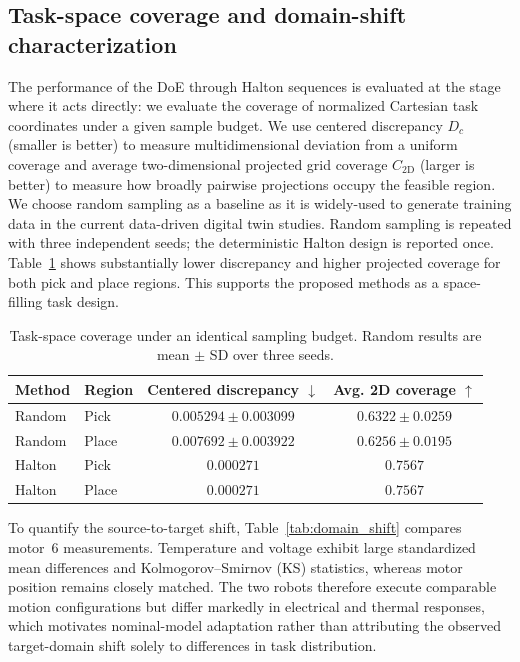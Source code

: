 \documentclass[a4paper,10pt]{cas-sc}%
\newcommand{\roundtworev}[1]{\textcolor{roundtwored}{#1}}
\newenvironment{revision}{}{}
\begin{document}
\subsection{Task-space coverage and domain-shift characterization}\label{sec:5-sensitivity}

\begin{revision}
	The performance of the DoE through Halton sequences is evaluated at the stage where it acts directly: we evaluate the coverage of normalized Cartesian task coordinates under a given sample budget. We use centered discrepancy $D_c$ (smaller is better) to measure multidimensional deviation from a uniform coverage and average two-dimensional projected grid coverage $C_{2\mathrm{D}}$ (larger is better) to measure how broadly pairwise projections occupy the feasible region. We choose random sampling as a baseline as it is widely-used to generate training data in the current data-driven digital twin studies. Random sampling is repeated with three independent seeds; the deterministic Halton design is reported once. Table~\ref{tab:doe_coverage} shows substantially lower discrepancy and higher projected coverage for both pick and place regions. This supports the proposed methods as a space-filling task design.
\end{revision}

\begin{table}[pos=htbp]
	\centering
	
	\caption{Task-space coverage under an identical sampling budget. Random results are mean $\pm$ SD over three seeds.}
	\label{tab:doe_coverage}
	\begin{tabular}{llcc}
		\toprule
 \textbf{Method} & \textbf{Region} & \textbf{Centered discrepancy $\downarrow$} & \textbf{Avg. 2D coverage $\uparrow$} \\
		\midrule
		Random & Pick   & $0.005294\pm0.003099$             & $0.6322\pm0.0259$           \\
		Random & Place  & $0.007692\pm0.003922$             & $0.6256\pm0.0195$           \\
		Halton & Pick   & $\boldsymbol{0.000271}$                        & $\boldsymbol{0.7567}$                    \\
		Halton & Place  & $\boldsymbol{0.000271}$                        & $\boldsymbol{0.7567}$                    \\
		\bottomrule
	\end{tabular}
\end{table}

\begin{revision}
	To quantify the source-to-target shift, Table~\ref{tab:domain_shift} compares motor~6 measurements. Temperature and voltage exhibit large standardized mean differences and Kolmogorov--Smirnov (KS) statistics, whereas motor position remains closely matched. The two robots therefore execute comparable motion configurations but differ markedly in electrical and thermal responses, \roundtworev{which motivates nominal-model adaptation rather than attributing the observed target-domain shift solely to differences in task distribution.}
\end{revision}
\end{document}
